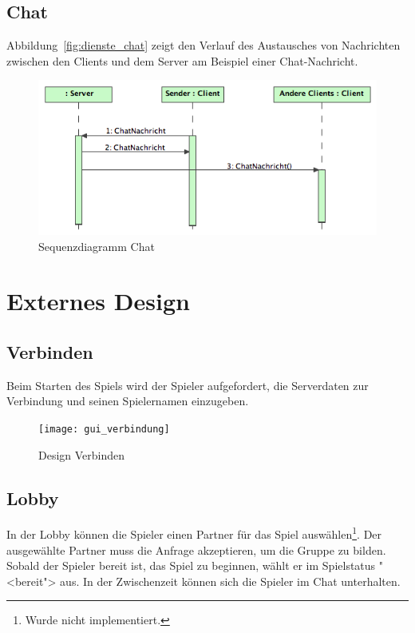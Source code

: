 \documentclass[12pt,halfparskip]{scrartcl}
\begin{document}
\clearpage
\subsection{Chat}
\label{sub:nachrichtenaustausch_zwischen_client_und_server}
Abbildung~\vref{fig:dienste_chat} zeigt den Verlauf des Austausches von Nachrichten zwischen den Clients und dem Server am Beispiel einer Chat-Nachricht.
\begin{figure}[h]
	\centering
	\includegraphics[width=\textwidth]{dienste_chat}
	\caption{Sequenzdiagramm Chat}
	\label{fig:dienste_chat}
\end{figure}

\clearpage
\section{Externes Design}
\label{externes_design}

\subsection{Verbinden}

Beim Starten des Spiels wird der Spieler aufgefordert, die Serverdaten zur Verbindung und seinen Spielernamen einzugeben.

\begin{figure}[h]
	\centering
	\texttt{[image: gui\_verbindung]}
	\caption{Design Verbinden}
	\label{fig:gui_verbindung}
\end{figure}

\clearpage

\subsection{Lobby}
\label{externes_design_lobby}

In der Lobby können die Spieler einen Partner für das Spiel auswählen\footnote{Wurde nicht implementiert.}. Der ausgewählte Partner muss die Anfrage akzeptieren, um die Gruppe zu bilden. Sobald der Spieler bereit ist, das Spiel zu beginnen, wählt er im Spielstatus "<bereit"> aus. In der Zwischenzeit können sich die Spieler im Chat unterhalten.
\end{document}
